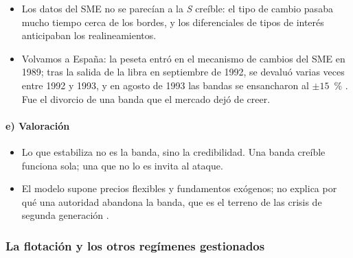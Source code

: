 \documentclass[11pt]{article}
\begin{document}
\begin{itemize}
\item Los datos del SME no se parecían a la \emph{S} creíble: el tipo de cambio pasaba mucho tiempo cerca de los bordes, y los diferenciales de tipos de interés anticipaban los realineamientos\nocite{BertolaCaballero1992Target}.
\item Volvamos a España: la peseta entró en el mecanismo de cambios del SME en 1989; tras la salida de la libra en septiembre de 1992, se devaluó varias veces entre 1992 y 1993, y en agosto de 1993 las bandas se ensancharon al $\pm15$~\%\nocite{EichengreenWyplosz1993Unstable}  . Fue el divorcio de una banda que el mercado dejó de creer.
\end{itemize}

\paragraph{e) Valoración}

\begin{itemize}
\item Lo que estabiliza no es la banda, sino la credibilidad. Una banda creíble funciona sola; una que no lo es invita al ataque.
\item El modelo supone precios flexibles y fundamentos exógenos; no explica por qué una autoridad abandona la banda, que es el terreno de las crisis de segunda generación .
\end{itemize}

\subsubsection{La flotación y los otros regímenes gestionados}\label{sec:flotacion}
\end{document}
